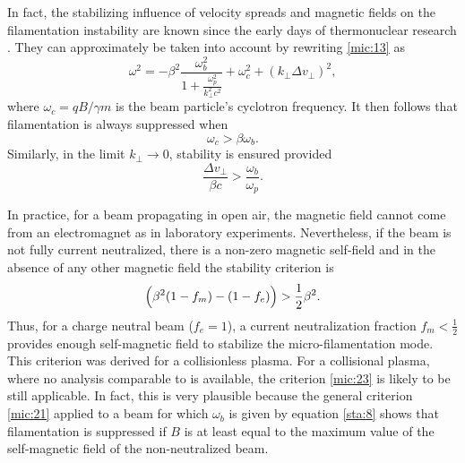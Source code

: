 \documentclass [12pt,a4paper,     ]{report} %
\newcommand{\Oh}{\tfrac{1}{2}}        %
\begin{document}
   In fact, the stabilizing influence of velocity spreads and magnetic fields on the filamentation instability are known since the early days of thermonuclear research \cite{FURTH1963-}.  They can approximately be taken into account by rewriting \eqref{mic:13} as \cite{KAPET1974-}
%
\begin{equation}\label{mic:20} %
       \omega^2 = -\beta^2 \frac{\omega_b^2}
                           { 1+\frac{\omega_p^2}{k_{\perp}^2 c^2} }
                  + \omega_c^2 + (k_{\perp}\Delta v_{\perp})^2,
\end{equation}
%
where $\omega_c = qB/\gamma m$ is the beam particle's cyclotron frequency.  It then follows that filamentation is always suppressed when 
%
\begin{equation}\label{mic:21} %
         \omega_c > \beta\omega_b.
\end{equation}
%
Similarly, in the limit $k_{\perp} \rightarrow 0$, stability is ensured provided
%
\begin{equation}\label{mic:22} %
         \frac{\Delta v_{\perp}}{\beta c} > \frac{\omega_b}{\omega_p}.
\end{equation}
%

   In practice, for a beam propagating in open air, the magnetic field cannot come from an electromagnet as in laboratory experiments.  Nevertheless, if the beam is not fully current neutralized, there is a non-zero magnetic self-field and in the absence of any other magnetic field the stability criterion is \cite{DAVID1975-}
%
\begin{equation}\label{mic:23} %
      \Bigl( \beta^2(1-f_m) - (1-f_e)  \Bigr) > \frac{1}{2}\beta^2.
\end{equation}
%
Thus, for a charge neutral beam ($f_e=1$), a current neutralization fraction $f_m  < \Oh$ provides enough self-magnetic field to stabilize the micro-filamentation mode.  This criterion was derived for a collisionless plasma.  For a collisional plasma, where no analysis comparable to \cite{DAVID1975-} is available, the criterion \eqref{mic:23} is likely to be still applicable.  In fact, this is very plausible because the general criterion \eqref{mic:21} applied to a beam for which $\omega_b$ is given by equation \eqref{sta:8} shows that filamentation is suppressed if $B$ is at least equal to the maximum value of the self-magnetic field of the non-neutralized beam.
\end{document}
